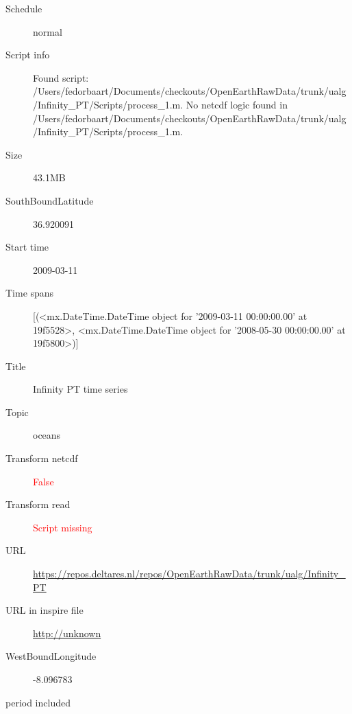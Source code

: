 \documentclass[9]{report}
\begin{document}
\begin{description}
\begin{verbatim}
\end{verbatim}
  \item[Schedule] normal
  \item[Script info] Found script: /Users/fedorbaart/Documents/checkouts/OpenEarthRawData/trunk/ualg/Infinity\_PT/Scripts/process\_1.m.
No netcdf logic found in /Users/fedorbaart/Documents/checkouts/OpenEarthRawData/trunk/ualg/Infinity\_PT/Scripts/process\_1.m.
  \item[Size] 43.1MB
  \item[SouthBoundLatitude] 36.920091
  \item[Start time] 2009-03-11
  \item[Time spans] [(<mx.DateTime.DateTime object for '2009-03-11 00:00:00.00' at 19f5528>, <mx.DateTime.DateTime object for '2008-05-30 00:00:00.00' at 19f5800>)]
  \item[Title]  Infinity PT time series 
  \item[Topic] oceans
  \item[Transform netcdf] \textcolor{red}{False}
  \item[Transform read] \textcolor{red}{Script missing}
  \item[URL] \href{https://repos.deltares.nl/repos/OpenEarthRawData/trunk/ualg/Infinity\_PT}{https://repos.deltares.nl/repos/OpenEarthRawData/trunk/ualg/Infinity\_PT}
  \item[URL in inspire file] \href{http://unknown}{http://unknown}
  \item[WestBoundLongitude] -8.096783
  \item[period included] 
\end{description}
\end{document}
